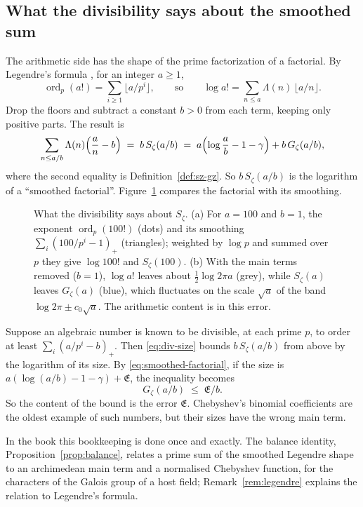 \documentclass[11pt]{amsbook}
\theoremstyle{plain}
\theoremstyle{definition}
\theoremstyle{remark}
\numberwithin{equation}{section}
\numberwithin{figure}{chapter}
\numberwithin{table}{chapter}
\newcommand{\Gz}{G_{\zeta}}
\newcommand{\Sz}{S_{\zeta}}
\newcommand{\ord}{\operatorname{ord}}
\begin{document}
\subsection{What the divisibility says about the smoothed sum}

The arithmetic side has the shape of the prime factorization of a
factorial. By Legendre's formula \cite{Legendre1808}, for an integer
$a \ge 1$,
\[
  \ord_p(a!) = \sum_{i \ge 1} \lfloor a/p^i \rfloor,
  \qquad\text{so}\qquad
  \log a! = \sum_{n \le a} \Lambda(n)\,\lfloor a/n \rfloor .
\]
Drop the floors and subtract a constant $b > 0$ from each term,
keeping only positive parts. The result is
\begin{equation}\label{eq:smoothed-factorial}
  \sum_{n \le a/b} \Lambda(n)\Bigl(\frac{a}{n} - b\Bigr)
  \;=\; b\,\Sz(a/b)
  \;=\; a\Bigl(\log\frac ab - 1 - \gamma\Bigr) + b\,\Gz(a/b),
\end{equation}
where the second equality is Definition~\ref{def:sz-gz}. So
$b\,\Sz(a/b)$ is the logarithm of a ``smoothed factorial''.
Figure~\ref{fig:smoothed-factorial} compares the factorial with its
smoothing.
\begin{figure}[tbp]
\centering
{}
\caption{What the divisibility says about $\Sz$. (a) For $a=100$ and
$b=1$, the exponent $\ord_p(100!)$ (dots) and its smoothing
$\sum_i(100/p^i-1)_+$ (triangles); weighted by $\log p$ and summed
over $p$ they give $\log 100!$ and $\Sz(100)$. (b) With the main
terms removed ($b=1$), $\log a!$ leaves about $\frac12\log2\pi a$
(grey), while $\Sz(a)$ leaves $\Gz(a)$ (blue), which fluctuates on
the scale $\sqrt a$ of the band $\log2\pi\pm c_0\sqrt a$. The
arithmetic content is in this error.}
\label{fig:smoothed-factorial}
\end{figure}

Suppose an algebraic number is known to be divisible, at each prime
$p$, to order at least $\sum_i (a/p^i - b)_+$. Then
\eqref{eq:div-size} bounds $b\,\Sz(a/b)$ from above by the logarithm
of its size. By \eqref{eq:smoothed-factorial}, if the size is
$a(\log(a/b) - 1 - \gamma) + \mathfrak E$, the inequality becomes
\[
  \Gz(a/b) \;\le\; \mathfrak E/b .
\]
So the content of the bound is the error $\mathfrak E$. Chebyshev's
binomial coefficients are the oldest example of such numbers, but
their sizes have the wrong main term.

In the book this bookkeeping is done once and exactly. The balance
identity, Proposition~\ref{prop:balance}, relates a prime sum of the
smoothed Legendre shape to an archimedean main term and a
normalised Chebyshev function, for the characters of the Galois
group of a host field; Remark~\ref{rem:legendre} explains the
relation to Legendre's formula.
\end{document}
